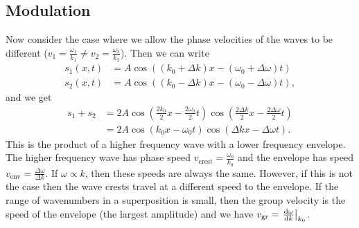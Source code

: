 \documentclass[../classical_mechanics.tex]{subfiles}
\begin{document}
        \subsection{Modulation}\label{subsec:modulation}
            Now consider the case where we allow the phase velocities of the waves to be different ($v_1=\frac{\omega_1}{k_1}\neq v_2=\frac{\omega_2}{k_2}$).
            Then we can write
            \begin{align}
                s_1(x,t)&=A\cos((k_0+\Delta k)x-(\omega_0+\Delta\omega)t)\\
                s_2(x,t)&=A\cos((k_0-\Delta k)x-(\omega_0-\Delta\omega)t),
            \end{align}
            and we get
            \begin{align}
                s_1+s_2&=2A\cos\left(\frac{2k_0}{2}x-\frac{2\omega_0}{2}t\right)\cos\left(\frac{2\Delta k}{2}x-\frac{2\Delta\omega}{2}t\right)\\
                &=2A\cos(k_0x-\omega_0t)\cos(\Delta kx-\Delta\omega t).
            \end{align}
            This is the product of a higher frequency wave with a lower frequency envelope.
            The higher frequency wave has phase speed $v_\text{crest}=\frac{\omega_0}{k_0}$ and the envelope has speed $v_\text{env}=\frac{\Delta\omega}{\Delta k}$.
            If $\omega\propto k$, then these speeds are always the same.
            However, if this is not the case then the wave crests travel at a different speed to the envelope.
            If the range of wavenumbers in a superposition is small, then the group velocity is the speed of the envelope (the largest amplitude) and we have $v_\text{gr}=\left.\dv{\omega}{k}\right|_{k_0}$.
        
\end{document}
